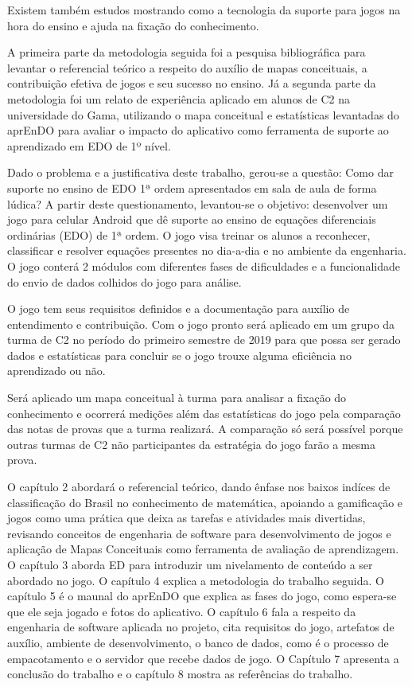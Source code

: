 Existem também estudos mostrando como a tecnologia da suporte para jogos na hora do ensino e ajuda na fixação do conhecimento. 

A primeira parte da metodologia seguida foi a pesquisa bibliográfica para levantar o referencial teórico a respeito do auxílio de mapas conceituais, a contribuição efetiva de jogos e seu sucesso no ensino. Já a segunda parte da metodologia foi um relato de experiência aplicado em alunos de C2 na universidade do Gama, utilizando o mapa conceitual e estatísticas levantadas do aprEnDO para avaliar o impacto do aplicativo como ferramenta de suporte ao aprendizado em EDO de 1º nível.


Dado o problema e a justificativa deste trabalho, gerou-se a questão: Como dar suporte no ensino de EDO 1ª ordem apresentados em sala de aula de forma lúdica? A partir deste questionamento, levantou-se o objetivo: desenvolver um jogo para celular Android que dê suporte ao ensino de equações diferenciais ordinárias (EDO) de 1ª ordem. O jogo visa treinar os alunos a reconhecer, classificar e resolver equações presentes no dia-a-dia e no ambiente da engenharia.
O jogo conterá 2 módulos com diferentes fases de dificuldades e a funcionalidade do envio de dados colhidos do jogo para análise.

O jogo tem seus requisitos definidos e a documentação para auxílio de entendimento e contribuição. Com o jogo pronto será aplicado em um grupo da turma de C2 no período do primeiro semestre de 2019 para que possa ser gerado dados e estatísticas para concluir se o jogo trouxe alguma eficiência no aprendizado ou não.

Será aplicado um mapa conceitual à turma para analisar a fixação do conhecimento e ocorrerá medições além das estatísticas do jogo pela comparação das notas de provas que a turma realizará. A comparação só será possível porque outras turmas de C2 não participantes da estratégia do jogo farão a mesma prova.

O capítulo 2 abordará o referencial teórico, dando ênfase nos baixos indíces de classificação do Brasil no conhecimento de matemática, apoiando a gamificação e jogos como uma prática que deixa as tarefas e atividades mais divertidas, revisando conceitos de engenharia de software para desenvolvimento de jogos e aplicação de Mapas Conceituais como ferramenta de avaliação de aprendizagem.
O capítulo 3 aborda ED para introduzir um nivelamento de conteúdo a ser abordado no jogo. O capítulo 4 explica a metodologia do trabalho seguida. O capítulo 5 é o maunal do aprEnDO que explica as fases do jogo, como espera-se que ele seja jogado e fotos do aplicativo. O capítulo 6 fala a respeito da engenharia de software aplicada no projeto, cita requisitos do jogo, artefatos de auxílio, ambiente de desenvolvimento, o banco de dados, como é o processo de empacotamento e o servidor que recebe dados de jogo. O Capítulo 7 apresenta a conclusão do trabalho e o capítulo 8 mostra as referências do trabalho.